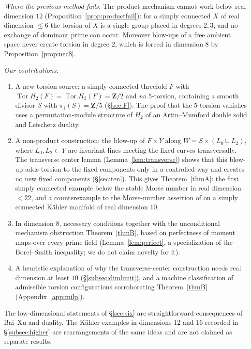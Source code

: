 \documentclass[11pt]{amsart}
\numberwithin{equation}{section}
\theoremstyle{definition}
\theoremstyle{remark}
\newcommand{\Z}{\mathbf Z}
\DeclareMathOperator{\Tor}{Tor}
\begin{document}
\emph{Where the previous method fails.} The product mechanism cannot work
below real dimension $12$ (Proposition~\ref{prop:productfail}): for a
simply connected $X$ of real dimension $\le 6$ the torsion of $X$ is a
single group placed in degrees $2,3$, and no exchange of dominant prime
can occur. Moreover blow-ups of a free ambient space never create torsion
in degree $2$, which is forced in dimension $8$ by
Proposition~\ref{prop:nec8}.

\emph{Our contributions.}
\begin{enumerate}
\item A new torsion source: a simply connected threefold $F$ with
  $\Tor H_2(F)=\Tor H_3(F)=\Z/2$ and \emph{no} $5$-torsion, containing a
  smooth divisor $S$ with $\pi_1(S)=\Z/5$ (\S\ref{sec:F}). The proof that
  the $5$-torsion vanishes uses a permutation-module structure of
  $H_2$ of an Artin--Mumford double solid and Lefschetz duality.
\item A non-product construction: the blow-up of $F\times Y$ along
  $W=S\times(L_0\sqcup L_2)$, where $L_0,L_2\subset Y$ are invariant lines
  meeting the fixed curves transversally. The transverse center lemma
  (Lemma~\ref{lem:transverse}) shows that this blow-up adds torsion to the
  fixed components only in a controlled way and creates no new fixed
  components (\S\ref{sec:ten}). This gives Theorem~\ref{thmA}: the first
  simply connected example below the stable Morse number in real dimension
  $<22$, and a counterexample to the Morse-number assertion of
  \cite{Ma2013} on a simply connected K\"ahler manifold of real dimension
  $10$.
\item In dimension $8$, necessary conditions together with the
  unconditional mechanism obstruction Theorem~\ref{thmB}, based on
  perfectness of moment maps over every prime field
  (Lemma~\ref{lem:perfect}, a specialization of the Borel--Smith
  inequality; we do not claim novelty for it).
\item A heuristic explanation of why the transverse-center construction
  needs real dimension at least $10$ (\S\ref{subsec:dimlimit}), and a
  machine classification of admissible torsion configurations
  corroborating Theorem~\ref{thmB} (Appendix~\ref{app:milp}).
\end{enumerate}
The low-dimensional statements of \S\ref{sec:six} are straightforward
consequences of Bai--Xu and duality. The K\"ahler examples in dimensions
$12$ and $16$ recorded in \S\ref{subsec:higher} are rearrangements of the
same ideas and are not claimed as separate results.
\end{document}
